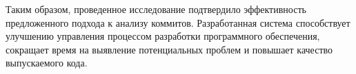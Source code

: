 Таким образом, проведенное исследование подтвердило эффективность предложенного подхода к анализу коммитов. Разработанная система способствует улучшению управления процессом разработки программного обеспечения, сокращает время на выявление потенциальных проблем и повышает качество выпускаемого кода.
